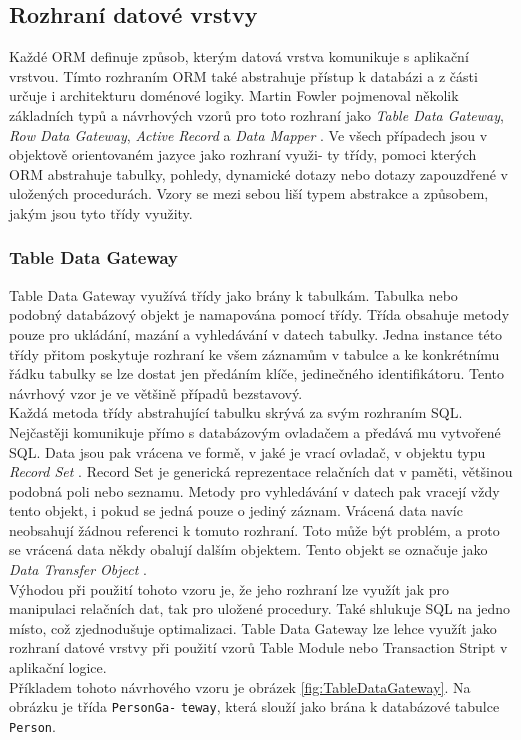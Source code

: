 \documentclass[ing,male,java,dept456]{diploma}						%
\begin{document}
\subsection{Rozhraní datové vrstvy}

Každé ORM definuje způsob, kterým datová vrstva komunikuje s aplikační vrstvou. Tímto rozhraním ORM také abstrahuje přístup k databázi a z části určuje i architekturu doménové logiky. Martin Fowler pojmenoval několik základních typů a návrhových vzorů pro toto rozhraní jako \textit{Table Data Gateway}, \textit{Row Data Gateway}, \textit{Active Record} a \textit{Data Mapper} \cite{fowler}. Ve všech případech jsou v objektově orientovaném jazyce jako rozhraní využi- ty třídy, pomoci kterých ORM abstrahuje tabulky, pohledy, dynamické 	dotazy nebo dotazy zapouzdřené v uložených procedurách. Vzory se mezi sebou liší typem abstrakce a způsobem, jakým jsou tyto třídy využity.

\subsubsection{Table Data Gateway}

Table Data Gateway využívá třídy jako brány k tabulkám. Tabulka nebo podobný databázový objekt je namapována pomocí třídy. Třída obsahuje metody pouze pro ukládání, mazání a vyhledávání v datech tabulky. Jedna instance této třídy přitom poskytuje rozhraní ke všem záznamům v tabulce a ke konkrétnímu řádku tabulky se lze dostat jen předáním klíče, jedinečného identifikátoru. Tento návrhový vzor je ve většině případů bezstavový. \\
Každá metoda třídy abstrahující tabulku skrývá za svým rozhraním SQL. Nejčastěji komunikuje přímo s databázovým ovladačem a předává mu vytvořené SQL. Data jsou pak vrácena ve formě, v jaké je vrací ovladač, v objektu typu \textit{Record Set} \cite{fowler}. Record Set je generická reprezentace relačních dat v paměti, většinou podobná poli nebo seznamu. Metody pro vyhledávání v datech pak vracejí vždy tento objekt, i pokud se jedná pouze o jediný záznam. Vrácená data navíc neobsahují žádnou referenci k tomuto rozhraní. Toto může být problém, a proto se vrácená data někdy obalují dalším objektem. Tento objekt se označuje jako \textit{Data Transfer Object} \cite{fowler}. \\
Výhodou při použití tohoto vzoru je, že jeho rozhraní lze využít jak pro manipulaci relačních dat, tak pro uložené procedury. Také shlukuje SQL na jedno místo, což zjednodušuje optimalizaci. Table Data Gateway lze lehce využít jako rozhraní datové vrstvy při použití vzorů Table Module nebo Transaction Stript v aplikační logice. \\
Příkladem tohoto návrhového vzoru je obrázek \ref{fig:TableDataGateway}. Na obrázku je třída \lstinline[style=inlinepython]|PersonGa-| \lstinline[style=inlinepython]|teway|, která slouží jako brána k databázové tabulce \lstinline[style=inlinepython]|Person|.
\end{document}
